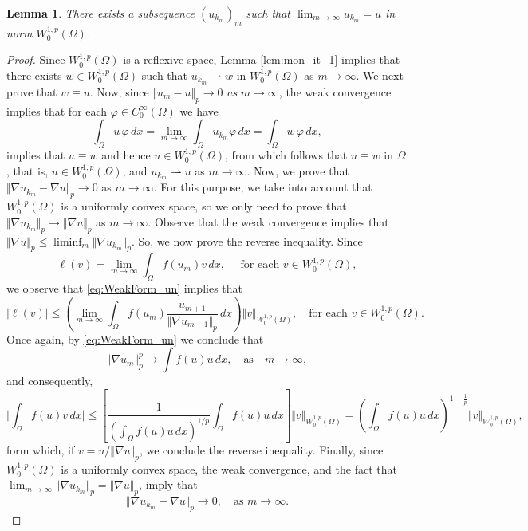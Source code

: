 \documentclass[11pt]{amsart}
\newtheorem{lemma}[theorem]{Lemma}
\theoremstyle{definition}
\begin{document}
\begin{lemma}
    There exists a subsequence $(u_{k_m})_m$ such that $\lim_{m\to\infty}u_{k_m}=u$ in norm $W_0^{1,p}(\Omega)$. 
\end{lemma}
\begin{proof}
Since $W_0^{1,p}(\Omega)$ is a reflexive space, Lemma \ref{lem:mon_it_1} implies that there exists $w\in W_0^{1,p}(\Omega)$  such that $u_{k_m}\rightharpoonup w$ in $W_0^{1,p}(\Omega)$ as $m\to\infty$. 
We next prove that $w\equiv u$. Now, since $\Vert u_m-u\Vert_p\to 0$ \textit{as} $m\to\infty$, the weak convergence implies that for each $\varphi\in C_0^\infty(\Omega)$ we have
    $$\int_\Omega u\,\varphi\, dx=\lim_{m\to\infty}\int_\Omega u_{k_m}\varphi\, dx=\int_\Omega w\,\varphi\, dx,$$
    implies that $u\equiv w$ and hence $u\in W_0^{1,p}(\Omega)$, from which follows that $u\equiv w$ in $\Omega$, that is, $u\in W_0^{1,p}(\Omega)$, and $u_{k_m}\rightharpoonup u$ as $m\to\infty$. Now, we prove that $\Vert \nabla u_{k_m}-\nabla u\Vert_p\to 0$ as $m\to\infty.$
    For this purpose, we take into account that $W_0^{1,p}(\Omega)$ is a uniformly convex space, so we only need to prove that
    $\Vert\nabla u_{k_m}\Vert_p\to\Vert\nabla u\Vert_p$ as $m\to\infty.$
    \medskip
    Observe that the weak convergence implies that $\Vert \nabla u\Vert_{p}\leq \liminf_{m}\Vert \nabla u_{k_m}\Vert_p$. So, we now prove the reverse inequality. Since 
    $$\ell(v)=\lim_{m\to\infty}\int_\Omega f(u_m)v\, dx,\quad\text{ for each }v\in W_0^{1,p}(\Omega),$$
    we observe that \eqref{eq:WeakForm_un} implies that
    $$\vert\ell(v)\vert\leq\left(\lim_{m\to\infty}\int_\Omega f(u_m)\frac{u_{m+1}}{\Vert\nabla u_{m+1}\Vert_p}\, dx\right)\Vert v\Vert_{W_{0}^{1,p}(\Omega)},\quad\text{for each }v\in W_0^{1,p}(\Omega).$$
    Once again, by \eqref{eq:WeakForm_un} we conclude that 
    $$\Vert\nabla u_m\Vert_p^p\to\int f(u)u\, dx,\quad\text{as}\quad m\to\infty,$$
    and consequently,
    $$\Bigg\vert\int_\Omega f(u)v\, dx\Bigg\vert\leq\left[\frac{1}{\left(\int_\Omega f(u)u\, dx\right)^{1/p}}\int_\Omega f(u)u\, dx\right]\Vert v\Vert_{W_{0}^{1,p}(\Omega)}=\left(\int_\Omega f(u)u\, dx\right)^{1-\frac{1}{p}}\Vert v\Vert_{W_{0}^{1,p}(\Omega)},$$
    form which, if $v=u/\Vert\nabla u\Vert_p$, we conclude the reverse inequality. Finally, since $W_0^{1,p}(\Omega)$ is a uniformly convex space, the weak convergence, and the fact that $\lim_{m\to\infty}\Vert\nabla u_{k_m}\Vert_p=\Vert\nabla u\Vert_p$, imply that 
    $$\Vert\nabla u_{k_m}-\nabla u\Vert_p\to 0,\quad\text{as }m\to\infty.$$
\end{proof}
\end{document}
